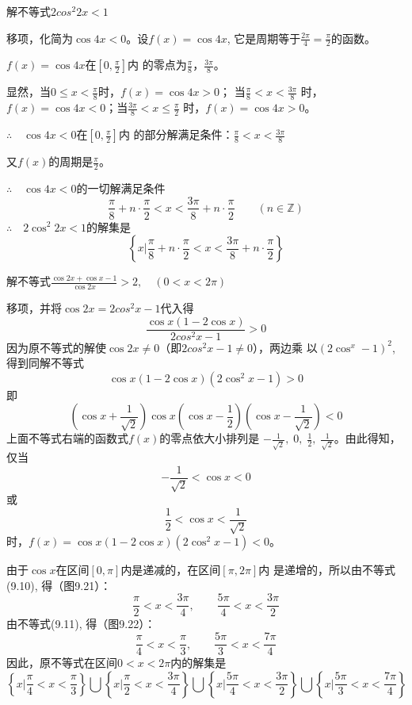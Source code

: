 \begin{example}
    解不等式$2cos^2 2x<1$
\end{example}

\begin{solution}
移项，化简为$\cos4x<0$。设$f(x)=\cos4x$, 它是周期等于$\frac{2\pi}{4}=\frac{\pi}{2}$的函数。

$f(x)=\cos4x$在$\left[0,\frac{\pi}{2}\right]$内
的零点为$\frac{\pi}{8}$，$\frac{3\pi}{8}$。

显然，当$0\le x<\frac{\pi}{8}$时，$f(x)=\cos4x>0$；
当$\frac{\pi}{8}<x<\frac{3\pi}{8}$
时，$f(x)=\cos4x<0$；当$\frac{3\pi}{8}<x\le \frac{\pi}{2}$
时，$f(x)=\cos4x>0$。

$\therefore\quad \cos4x<0$在$\left[0,\frac{\pi}{2}\right]$内
的部分解满足条件：$\frac{\pi}{8}<x<\frac{3\pi}{8}$

又$f(x)$的周期是$\frac{\pi}{2}$。

$\therefore\quad \cos4x<0$的一切解满足条件
\[\frac{\pi}{8}+n\cdot\frac{\pi}{2}<x<\frac{3\pi}{8}+n\cdot\frac{\pi}{2}\qquad (n\in\mathbb{Z})\]
$\therefore\quad 2\cos^2 2x<1$的解集是
\[\left\{x\Big| \frac{\pi}{8}+n\cdot\frac{\pi}{2}<x<\frac{3\pi}{8}+n\cdot\frac{\pi}{2}\right\}\]
\end{solution}


\begin{example}
    解不等式$\frac{\cos2x+\cos x-1}{\cos2x}>2,\quad (0<x<2\pi)$
\end{example}

\begin{solution}
    移项，并将$\cos2x=2cos^2x-1$代入得
   \[\frac{\cos x(1-2\cos x)}{2cos^2x-1}>0\] 
    因为原不等式的解使$\cos2x\ne 0$（即$2cos^2x-1\ne 0$），两边乘
    以$(2\cos^x-1)^2$, 得到同解不等式
 \[   \cos x(1-2\cos x)(2\cos^2x-1)>0\]
    即
\[\left(\cos x+\frac{1}{\sqrt{2}}\right)\cos x\left(\cos x-\frac{1}{2}\right)\left(\cos x-\frac{1}{\sqrt{2}}\right)<0\]
上面不等式右端的函数式$f(x)$的零点依大小排列是
$-\frac{1}{\sqrt{2}},\; 0,\; \frac{1}{2},\; \frac{1}{\sqrt{2}}$。由此得知，仅当
\begin{equation}
    -\frac{1}{\sqrt{2}}<\cos x<0
\end{equation}
或
\begin{equation}
    \frac{1}{2}<\cos x<\frac{1}{\sqrt{2}}
\end{equation}
时，$f(x)=\cos x(1-2\cos x)(2\cos^2x-1)<0$。

由于$\cos x$在区间$[0,\pi]$内是递减的，在区间$[\pi,2\pi]$内
是递增的，所以由不等式(9.10), 得（图9.21）：
\[\frac{\pi}{2}<x<\frac{3\pi}{4},\qquad \frac{5\pi}{4}<x<\frac{3\pi}{2}\]
由不等式(9.11), 得（图9.22）：
\[\frac{\pi}{4}<x<\frac{\pi}{3},\qquad \frac{5\pi}{3}<x<\frac{7\pi}{4}\]
因此，原不等式在区间$0<x<2\pi$内的解集是
\[\left\{x\Big|\frac{\pi}{4}<x<\frac{\pi}{3} \right\}\bigcup\left\{x\Big|\frac{\pi}{2}<x<\frac{3\pi}{4} \right\}\bigcup\left\{x\Big|\frac{5\pi}{4}<x<\frac{3\pi}{2} \right\}\bigcup\left\{x\Big|\frac{5\pi}{3}<x<\frac{7\pi}{4} \right\}\]
\end{solution}

